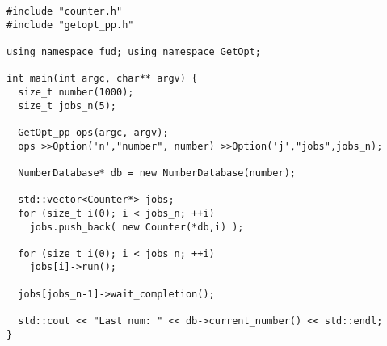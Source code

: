 \documentclass[xcolor=pdftex,dvipsnames,table,10pt,babel]{beamer}
\begin{document}

\begin{frame}[fragile]
\lstset{language=C++}
\begin{lstlisting}[frame=single]
#include "counter.h"
#include "getopt_pp.h"

using namespace fud; using namespace GetOpt;

int main(int argc, char** argv) {
  size_t number(1000);
  size_t jobs_n(5);

  GetOpt_pp ops(argc, argv);
  ops >>Option('n',"number", number) >>Option('j',"jobs",jobs_n);

  NumberDatabase* db = new NumberDatabase(number);

  std::vector<Counter*> jobs;
  for (size_t i(0); i < jobs_n; ++i)
    jobs.push_back( new Counter(*db,i) );

  for (size_t i(0); i < jobs_n; ++i)
    jobs[i]->run();

  jobs[jobs_n-1]->wait_completion();

  std::cout << "Last num: " << db->current_number() << std::endl;
}
\end{lstlisting}

\end{frame}
\end{document}
